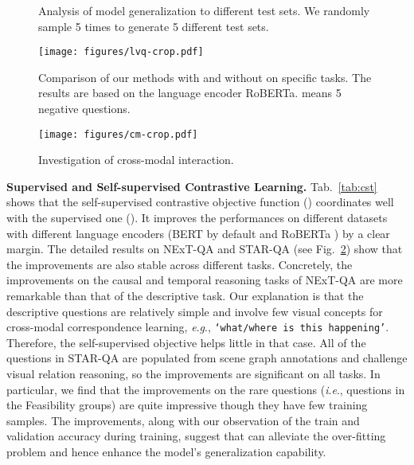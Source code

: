 \documentclass[10pt,journal,compsoc]{IEEEtran}
\newcommand{\ie}{\textit{i}.\textit{e}.}
\newcommand{\eg}{\textit{e}.\textit{g}.}
\begin{document}
\begin{figure}[t!]
  \begin{center}
  \end{center}
  \vspace{-1.0em}
  \caption{Analysis of model generalization to different test sets. We randomly sample 5 times to generate 5 different test sets.}
  \label{fig:newans}
\vspace{-0.4cm}
\end{figure}

\begin{figure}[t!]
  \begin{center}
    \texttt{[image: figures/lvq-crop.pdf]}
  \end{center}
  \vspace{-1em}
  \caption{Comparison of our methods with and without  on specific tasks. The results are based on the language encoder RoBERTa.  means 5 negative questions.}
  \label{fig:cst}
\end{figure}

\begin{figure*}[t!]
  \begin{center}
    \texttt{[image: figures/cm-crop.pdf]}
  \end{center}
  \vspace{-0.4cm}
  \caption{Investigation of cross-modal interaction.}
  \label{fig:cm}
  \vspace{-0.4cm}
\end{figure*}
\textbf{Supervised and Self-supervised Contrastive Learning.}
Tab.~\ref{tab:cst} shows that the self-supervised contrastive objective function () coordinates well with the supervised one (). It improves the performances on different datasets with different language encoders (BERT \cite{devlin2018bert} by default and RoBERTa \cite{liu2019roberta}) by a clear margin. The detailed results on NExT-QA and STAR-QA (see Fig.~\ref{fig:cst}) show that the improvements are also stable across different tasks. Concretely, the improvements on the causal and temporal reasoning tasks of NExT-QA are more remarkable than that of the descriptive task. Our explanation is that the descriptive questions are relatively simple and involve few visual concepts for cross-modal correspondence learning, \eg, \texttt{`what/where is this happening'}. Therefore, the self-supervised objective helps little in that case. All of the questions in STAR-QA are populated from scene graph annotations and challenge visual relation reasoning, so the improvements are significant on all tasks. In particular, we find that the improvements on the rare questions (\ie, questions in the Feasibility groups) are quite impressive though they have few training samples. The improvements, along with our observation of the train and validation accuracy during training, suggest that  can alleviate the over-fitting problem and hence enhance the model's generalization capability.
\end{document}
